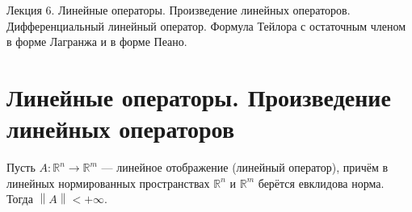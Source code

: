 \documentclass[11pt]{article}
\begin{document}
\begin{titlepage}
    \centering
    \vspace*{\fill}  %

    {\Huge Лекция 6. Линейные операторы. Произведение линейных операторов. Дифференциальный линейный оператор. Формула Тейлора с
    остаточным членом в форме Лагранжа и в форме Пеано.
    \par}

    \vspace*{\fill}  %
\end{titlepage}

\setcounter{page}{1}

\section{Линейные операторы. Произведение линейных операторов}

\begin{theorem}
    Пусть $A \colon \mathbb{R}^n \to \mathbb{R}^m$ --- линейное отображение (линейный оператор), причём
    в линейных нормированных пространствах $\mathbb{R}^n$ и $\mathbb{R}^m$ берётся евклидова норма. Тогда $\left\lVert A \right\rVert < +\infty $.
\end{theorem}
\end{document}
